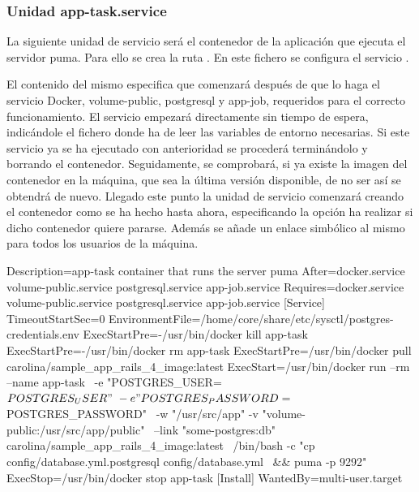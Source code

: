 \subsubsection{Unidad app-task.service}

La siguiente unidad de servicio será el contenedor de la aplicación que ejecuta el servidor puma. Para ello se crea la ruta . En este fichero se configura el servicio .

El contenido del mismo especifica que comenzará después de que lo haga el servicio Docker, volume-public, postgresql y app-job, requeridos para el correcto funcionamiento. El servicio empezará directamente sin tiempo de espera, indicándole el fichero donde ha de leer las variables de entorno necesarias. Si este servicio ya se ha ejecutado con anterioridad se procederá terminándolo y borrando el contenedor. Seguidamente, se comprobará, si ya existe la imagen del contenedor en la máquina, que sea la última versión disponible, de no ser así se obtendrá de nuevo. Llegado este punto la unidad de servicio comenzará creando el contenedor como se ha hecho hasta ahora, especificando la opción ha realizar si dicho contenedor quiere pararse. Además se añade un enlace simbólico al mismo para todos los usuarios de la máquina. 

\begin{codelisting}
\label{code:app-task.service}
\begin{code}
[Unit] 
  Description=app-task container that runs the server puma
  After=docker.service volume-public.service postgresql.service app-job.service
  Requires=docker.service volume-public.service postgresql.service app-job.service
[Service] 
  TimeoutStartSec=0 
  EnvironmentFile=/home/core/share/etc/sysctl/postgres-credentials.env
  ExecStartPre=-/usr/bin/docker kill app-task 
  ExecStartPre=-/usr/bin/docker rm app-task
  ExecStartPre=/usr/bin/docker pull carolina/sample_app_rails_4_image:latest 
  ExecStart=/usr/bin/docker run --rm --name app-task \
  -e "POSTGRES_USER=${POSTGRES_USER}" \
  -e "POSTGRES_PASSWORD=${POSTGRES_PASSWORD}" \
  -w "/usr/src/app" -v "volume-public:/usr/src/app/public" \
  --link "some-postgres:db" carolina/sample_app_rails_4_image:latest \
  /bin/bash -c "cp config/database.yml.postgresql config/database.yml \
  && puma -p 9292"
  ExecStop=/usr/bin/docker stop app-task
[Install] 
  WantedBy=multi-user.target
\end{code}
\end{codelisting}

